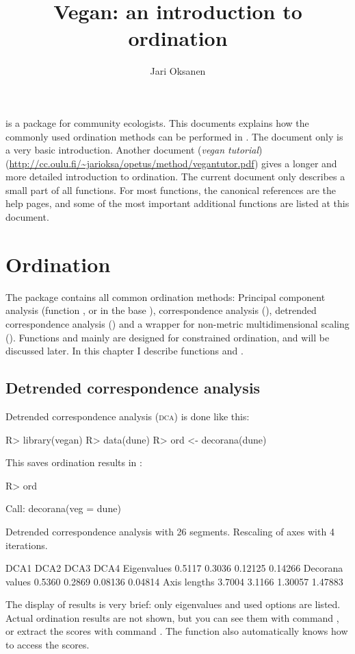 \documentclass[article,nojss]{jss}
\title{Vegan: an introduction to ordination}
\author{Jari Oksanen}
\begin{document}


\tableofcontents

\vspace{3ex}
\noindent {} is a package for community ecologists.  This
documents explains how the commonly used ordination methods can be
performed in .  The document only is a very basic
introduction.  Another document (\emph{vegan tutorial})
(\url{http://cc.oulu.fi/~jarioksa/opetus/method/vegantutor.pdf}) gives
a longer and more detailed introduction to ordination.  The
current document only describes a small part of all 
functions.  For most functions, the canonical references are the
 help pages, and some of the most important additional
functions are listed at this document.

\section{Ordination}

The  package contains all common ordination methods:
Principal component analysis (function , or  in
the base ), correspondence analysis (),
detrended correspondence analysis () and a wrapper for
non-metric multidimensional scaling ().  Functions
 and  mainly are designed for constrained
ordination, and will be discussed later.  In this chapter I describe
functions  and .

\subsection{Detrended correspondence analysis}


Detrended correspondence analysis (\textsc{dca}) is done like this:
\begin{Schunk}
\begin{Sinput}
R> library(vegan)
R> data(dune)
R> ord <- decorana(dune)
\end{Sinput}
\end{Schunk}
This saves ordination results in :
\begin{Schunk}
\begin{Sinput}
R> ord
\end{Sinput}
\begin{Soutput}
Call:
decorana(veg = dune) 

Detrended correspondence analysis with 26 segments.
Rescaling of axes with 4 iterations.

                  DCA1   DCA2    DCA3    DCA4
Eigenvalues     0.5117 0.3036 0.12125 0.14266
Decorana values 0.5360 0.2869 0.08136 0.04814
Axis lengths    3.7004 3.1166 1.30057 1.47883
\end{Soutput}
\end{Schunk}
The display of results is very brief: only eigenvalues and used
options are listed.  Actual ordination results are not shown, but you
can see them with command , or extract the scores
with command .  The  function also
automatically knows how to access the scores.
\end{document}
